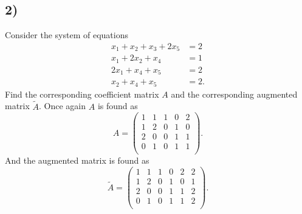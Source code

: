 \subsection*{2)}
Consider the system of equations
\begin{align*}
  x_1 + x_2 + x_3 + 2x_5 &= 2 \\
  x_1 + 2x_2 + x_4 &= 1 \\
  2x_1 + x_4 + x_5 &= 2 \\
  x_2 + x_4 + x_5 &= 2
.\end{align*}
Find the corresponding coefficient matrix $A$ and the corresponding augmented matrix $\tilde{A}$.
\bigbreak
Once again $A$ is found as
\[ 
A = \begin{pmatrix}
1 & 1 & 1 & 0 & 2\\
1 & 2 & 0 & 1 & 0\\
2 & 0 & 0 & 1 & 1\\
0 & 1 & 0 & 1 & 1\\
\end{pmatrix}
.\]
And the augmented matrix is found as
\[ 
  \tilde{A} = \left( \begin{array}{ccccc|c}
  1 & 1 & 1 & 0 & 2 & 2\\
  1 & 2 & 0 & 1 & 0 & 1\\
  2 & 0 & 0 & 1 & 1 & 2\\
  0 & 1 & 0 & 1 & 1 & 2\\
  \end{array} \right)
.\]


